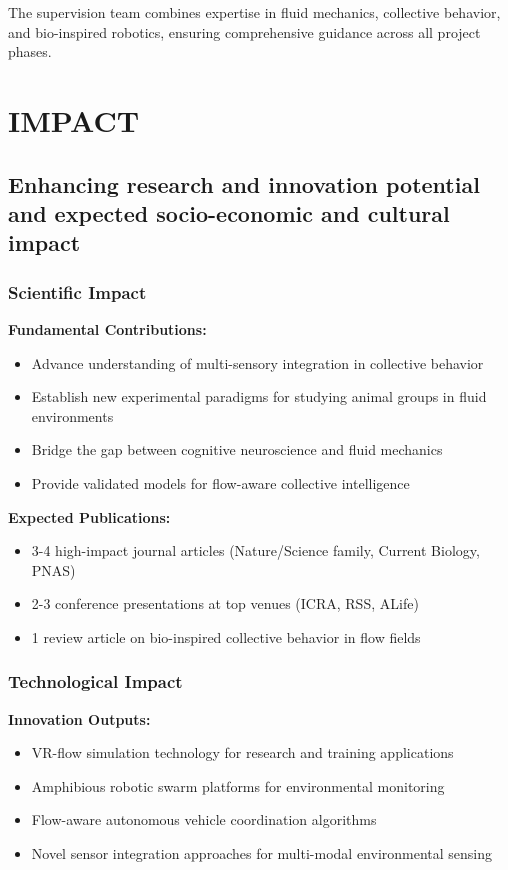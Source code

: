 \documentclass[11pt,a4paper]{article}
\newcommand{\highlight}[1]{\textbf{\color{blue!70!black} #1}}
\begin{document}
The supervision team combines expertise in fluid mechanics, collective behavior, and bio-inspired robotics, ensuring comprehensive guidance across all project phases.

\section{IMPACT}

\subsection{Enhancing research and innovation potential and expected socio-economic and cultural impact}

\subsubsection{Scientific Impact}

\highlight{Fundamental Contributions:}
\begin{itemize}[noitemsep]
\item Advance understanding of multi-sensory integration in collective behavior
\item Establish new experimental paradigms for studying animal groups in fluid environments
\item Bridge the gap between cognitive neuroscience and fluid mechanics
\item Provide validated models for flow-aware collective intelligence
\end{itemize}

\highlight{Expected Publications:}
\begin{itemize}[noitemsep]
\item 3-4 high-impact journal articles (Nature/Science family, Current Biology, PNAS)
\item 2-3 conference presentations at top venues (ICRA, RSS, ALife)
\item 1 review article on bio-inspired collective behavior in flow fields
\end{itemize}

\subsubsection{Technological Impact}

\highlight{Innovation Outputs:}
\begin{itemize}[noitemsep]
\item VR-flow simulation technology for research and training applications
\item Amphibious robotic swarm platforms for environmental monitoring
\item Flow-aware autonomous vehicle coordination algorithms
\item Novel sensor integration approaches for multi-modal environmental sensing
\end{itemize}
\end{document}
